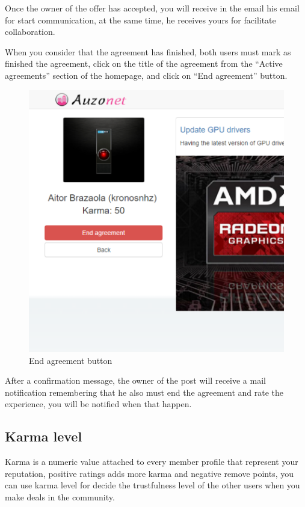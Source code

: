 \documentclass{DeustoFDP}
\begin{document}
Once the owner of the offer has accepted, you will receive in the email his email for start communication, at the same time, he receives yours for facilitate collaboration.

When you consider that the agreement has finished, both users must mark as finished the agreement, click on the title of the agreement from the “Active agreements” section of the homepage, and click on “End agreement” button.

\begin{figure}[h!]
\centering
\includegraphics[width=0.9\linewidth]{fig/Manual/endagreementclient}
\caption[End agreement button]{End agreement button}
\label{fig:endagreementclient}
\end{figure}


After a confirmation message, the owner of the post will receive a mail notification remembering that he also must end the agreement and rate the experience, you will be notified when that happen.
\newpage
\subsection{Karma level}
Karma is a numeric value attached to every member profile that represent your reputation, positive ratings adds more karma and negative remove points, you can use karma level for decide the trustfulness level of the other users when you make deals in the community.
\end{document}
